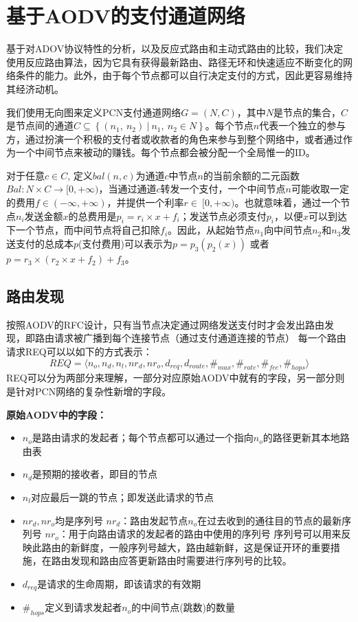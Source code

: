 \documentclass[12pt,a4paper]{article}
\begin{document}
\clearpage

\section{基于AODV的支付通道网络}
基于对ADOV协议特性的分析，以及反应式路由和主动式路由的比较，我们决定使用反应路由算法，因为它具有获得最新路由、路径无环和快速适应不断变化的网络条件的能力。此外，由于每个节点都可以自行决定支付的方式，因此更容易维持其经济动机。

我们使用无向图来定义PCN支付通道网络$G=(N,C)$，其中$N$是节点的集合，$C$是节点间的通道$C\subseteq \left\{(n_1,\ n_2)\ |\ n_1,\ n_2\in N\right\}$。每个节点$n$代表一个独立的参与方，通过扮演一个积极的支付者或收款者的角色来参与到整个网络中，或者通过作为一个中间节点来被动的赚钱。每个节点都会被分配一个全局惟一的ID。

对于任意$c\in C$, 定义$bal(n,c)$为通道$c$中节点$n$的当前余额的二元函数$Bal: N\times C\rightarrow[0,+\infty)$，当通过通道$c$转发一个支付，一个中间节点$n$可能收取一定的费用$f\in(-\infty,+\infty)$，并提供一个利率$r\in\ [0,+\infty)$。也就意味着，通过一个节点$n_i$发送金额$x$的总费用是$p_i=r_i\times x+f_i$；发送节点必须支付$p_i$，以便$x$可以到达下一个节点，而中间节点将自己扣除$f_i$。因此，从起始节点$n_1$向中间节点$n_2$和$n_3$发送支付的总成本$p$(支付费用)可以表示为$p=p_3(p_2(x))$ 或者$p=r_3\times\left(r_2\times x+f_2\right)+f_3$。

\subsection{路由发现}
按照AODV的RFC设计，只有当节点决定通过网络发送支付时才会发出路由发现，即路由请求被广播到每个连接节点（通过支付通道连接的节点）
每一个路由请求REQ可以以如下的方式表示：
\begin{equation}
REQ=\langle n_o, n_d, n_l, {nr}_d, {nr}_o, d_{req},d_{route},\#_{max},\#_{rate},\#_{fee},\#_{hops}\rangle
\end{equation}
REQ可以分为两部分来理解，一部分对应原始AODV中就有的字段，另一部分则是针对PCN网络的复杂性新增的字段。

\textbf{原始AODV中的字段：}
\begin{itemize}
	\item $n_o$是路由请求的发起者；每个节点都可以通过一个指向$n_o$的路径更新其本地路由表
	\item $n_d$是预期的接收者，即目的节点
	\item $n_l$对应最后一跳的节点；即发送此请求的节点
	\item ${nr}_d, {nr}_o$均是序列号
	\iitem ${nr}_d$：路由发起节点$n_o$在过去收到的通往目的节点的最新序列号
	\iitem ${nr}_o$：用于向路由请求的发起者的路由中使用的序列号
	序列号可以用来反映此路由的新鲜度，一般序列号越大，路由越新鲜，这是保证开环的重要措施，在路由发现和路由应答更新路由时需要进行序列号的比较。
	\item $d_{req}$是请求的生命周期，即该请求的有效期
	\item $\#_{hops}$定义到请求发起者$n_o$的中间节点(跳数)的数量
\end{itemize}
\end{document}
